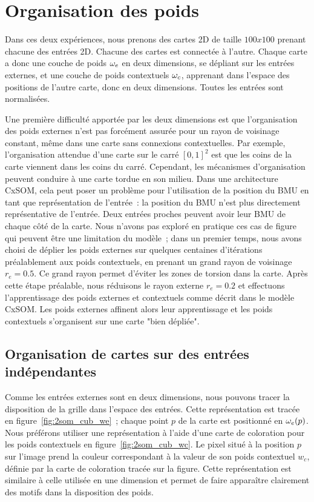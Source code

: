 \documentclass[../main]{subfiles}
\begin{document}
\section{Organisation des poids}

Dans ces deux expériences, nous prenons des cartes 2D de taille $100x100$ prenant chacune des entrées 2D. Chacune des cartes est connectée à l'autre. Chaque carte a donc une couche de poids $\omega_{e}$ en deux dimensions, se dépliant sur les entrées externes, et une couche de poids contextuels $\omega_c$, apprenant dans l'espace des positions de l'autre carte, donc en deux dimensions. Toutes les entrées sont normalisées.

Une première difficulté apportée par les deux dimensions est que l'organisation des poids externes n'est pas forcément assurée pour un rayon de voisinage constant, même dans une carte sans connexions contextuelles. Par exemple, l'organisation attendue d'une carte sur le carré $[0,1]^2$ est que les coins de la carte viennent dans les coins du carré. Cependant, les mécanismes d'organisation peuvent conduire à une carte tordue en son milieu.
Dans une architecture CxSOM, cela peut poser un problème pour l'utilisation de la position du BMU en tant que représentation de l'entrée~: la position du BMU n'est plus directement représentative de l'entrée. Deux entrées proches peuvent avoir leur BMU de chaque côté de la carte.
Nous n'avons pas exploré en pratique ces cas de figure qui peuvent être une limitation du modèle~; dans un premier temps, nous avons choisi de déplier les poids externes sur quelques centaines d'itérations préalablement aux poids contextuels, en prenant un grand rayon de voisinage $r_e = 0.5$. Ce grand rayon permet d'éviter les zones de torsion dans la carte. Après cette étape préalable, nous réduisons le rayon externe $r_e = 0.2$ et effectuons l'apprentissage des poids externes et contextuels comme décrit dans le modèle CxSOM. Les poids externes affinent alors leur apprentissage et les poids contextuels s'organisent sur une carte "bien dépliée".

\subsection{Organisation de cartes sur des entrées indépendantes}

Comme les entrées externes sont en deux dimensions, nous pouvons tracer la disposition de la grille dans l'espace des entrées.
Cette représentation est tracée en figure~\ref{fig:2som_cub_we}~; chaque point $p$ de la carte est positionné en $\omega_e(p)$. Nous préférons utiliser une représentation à l'aide d'une carte de coloration pour les poids contextuels en figure~\ref{fig:2som_cub_wc}. Le pixel situé à la position $p$ sur l'image prend la couleur correspondant à la valeur de son poids contextuel $w_c$, définie par la carte de coloration tracée sur la figure.
Cette représentation est similaire à celle utilisée en une dimension et permet de faire apparaître clairement des motifs dans la disposition des poids.
\end{document}
